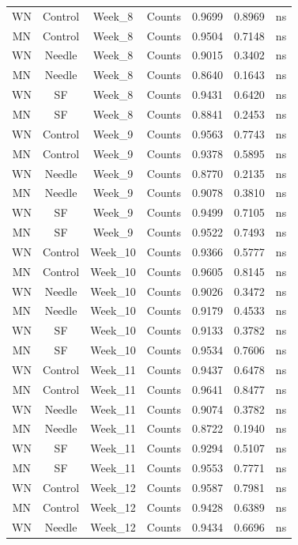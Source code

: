 \documentclass[
  12pt,
  letterpaper,
]{article}
\begin{document}
\begin{longtable}{ccclrrl}
WN & Control & Week\_8 & Counts & 0.9699 & 0.8969 & ns \\ 
MN & Control & Week\_8 & Counts & 0.9504 & 0.7148 & ns \\ 
WN & Needle & Week\_8 & Counts & 0.9015 & 0.3402 & ns \\ 
MN & Needle & Week\_8 & Counts & 0.8640 & 0.1643 & ns \\ 
WN & SF & Week\_8 & Counts & 0.9431 & 0.6420 & ns \\ 
MN & SF & Week\_8 & Counts & 0.8841 & 0.2453 & ns \\ 
WN & Control & Week\_9 & Counts & 0.9563 & 0.7743 & ns \\ 
MN & Control & Week\_9 & Counts & 0.9378 & 0.5895 & ns \\ 
WN & Needle & Week\_9 & Counts & 0.8770 & 0.2135 & ns \\ 
MN & Needle & Week\_9 & Counts & 0.9078 & 0.3810 & ns \\ 
WN & SF & Week\_9 & Counts & 0.9499 & 0.7105 & ns \\ 
MN & SF & Week\_9 & Counts & 0.9522 & 0.7493 & ns \\ 
WN & Control & Week\_10 & Counts & 0.9366 & 0.5777 & ns \\ 
MN & Control & Week\_10 & Counts & 0.9605 & 0.8145 & ns \\ 
WN & Needle & Week\_10 & Counts & 0.9026 & 0.3472 & ns \\ 
MN & Needle & Week\_10 & Counts & 0.9179 & 0.4533 & ns \\ 
WN & SF & Week\_10 & Counts & 0.9133 & 0.3782 & ns \\ 
MN & SF & Week\_10 & Counts & 0.9534 & 0.7606 & ns \\ 
WN & Control & Week\_11 & Counts & 0.9437 & 0.6478 & ns \\ 
MN & Control & Week\_11 & Counts & 0.9641 & 0.8477 & ns \\ 
WN & Needle & Week\_11 & Counts & 0.9074 & 0.3782 & ns \\ 
MN & Needle & Week\_11 & Counts & 0.8722 & 0.1940 & ns \\ 
WN & SF & Week\_11 & Counts & 0.9294 & 0.5107 & ns \\ 
MN & SF & Week\_11 & Counts & 0.9553 & 0.7771 & ns \\ 
WN & Control & Week\_12 & Counts & 0.9587 & 0.7981 & ns \\ 
MN & Control & Week\_12 & Counts & 0.9428 & 0.6389 & ns \\ 
WN & Needle & Week\_12 & Counts & 0.9434 & 0.6696 & ns \\ 

\end{longtable}
\end{document}
